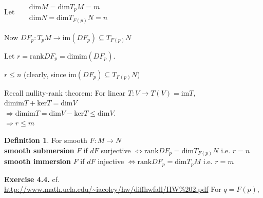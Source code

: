\documentclass[11pt]{amsart}
\theoremstyle{definition}
\newtheorem{definition}{Definition}
\newcommand{\exercisehead}[1]{\medskip\noindent\textbf{Exercise #1.} }
\begin{document}
 \quad \quad \quad \, 

Let \quad \, $\begin{aligned} & \quad \\
 &  \text{dim}M = \text{dim}T_pM = m \\
 &  \text{dim}N = \text{dim}T_{F(p)}N = n
\end{aligned}$

Now $DF_p : T_pM \to \text{im}(DF_p) \subseteq T_{F(p)}N$

Let $r = \text{rank}DF_p = \text{dim}\text{im}(DF_p)$.

$r\leq n$ (clearly, since $\text{im}(DF_p) \subseteq T_{F(p)}N$)

Recall nullity-rank theorem: For linear $T: V \to T(V) = \text{im}T$, \\
\phantom{Recall} $\text{dim}\text{im}T + \text{ker}T = \text{dim}V$ \\
\phantom{Recall} $\Longrightarrow \text{dim}\text{im}T = \text{dim}V - \text{ker}T \leq \text{dim}V$.  \\
$\Longrightarrow r \leq m$

\begin{definition}
        For smooth $F: M \to N$ \\
        \textbf{smooth submersion} $F$ if $dF$ surjective $\Longleftrightarrow  \text{rank}DF_p = \text{dim} T_{F(p)}N$ i.e. $r=n$ \\
        \textbf{smooth immersion} $F$ if $dF$ injective $\Longleftrightarrow  \text{rank}DF_p = \text{dim} T_{p}M$ i.e. $r=m$ \\
\end{definition}

\exercisehead{4.4} cf. \url{http://www.math.ucla.edu/~iacoley/hw/diffhwfall/HW%202.pdf} For $q=F(p)$,
\end{document}
